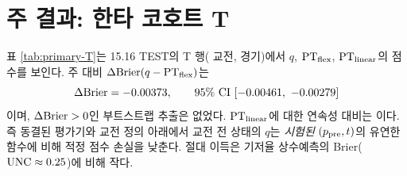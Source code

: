 \section{주 결과: 한타 코호트 T}
\label{sec:pred-primary-T}

표 \ref{tab:primary-T}는 15.16 TEST의 T 행(\numTTest{} 교전, \numTTestMatches{} 경기)에서 $q$, $\mathrm{PT}_{\mathrm{flex}}$, $\mathrm{PT}_{\mathrm{linear}}$의 점수를 보인다. 주 대비 $\Delta\mathrm{Brier}(q - \mathrm{PT}_{\mathrm{flex}})$는
\begin{equation}
  \Delta\mathrm{Brier} = -0.00373, \qquad 95\%\ \text{CI}\ [-0.00461,\ -0.00279]
\end{equation}
이며, $\Delta\mathrm{Brier} > 0$인 부트스트랩 추출은 없었다. $\mathrm{PT}_{\mathrm{linear}}$에 대한 연속성 대비는 \dBrierTlin{} \ci{\dBrierTlinLo}{\dBrierTlinHi}이다. 즉 동결된 평가기와 교전 정의 아래에서 교전 전 상태의 $q$는 \emph{시험된} $(p_{\mathrm{pre}}, t)$의 유연한 함수에 비해 적정 점수 손실을 낮춘다. 절대 이득은 기저율 상수예측의 Brier($\operatorname{UNC} \approx 0.25$)에 비해 작다.


